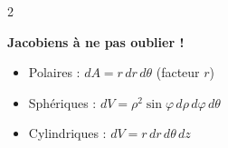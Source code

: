 \documentclass[10pt,a4paper]{article}
\begin{document}
\begin{multicols}{2}
\begin{alertbox}
\textbf{Jacobiens à ne pas oublier !}
\begin{itemize}[leftmargin=1em,itemsep=0pt]
  \item Polaires : $dA = r\,dr\,d\theta$ (facteur $r$)
  \item Sphériques : $dV = \rho^2\sin\varphi\,d\rho\,d\varphi\,d\theta$
  \item Cylindriques : $dV = r\,dr\,d\theta\,dz$
\end{itemize}
\end{alertbox}

\end{multicols}
\end{document}
